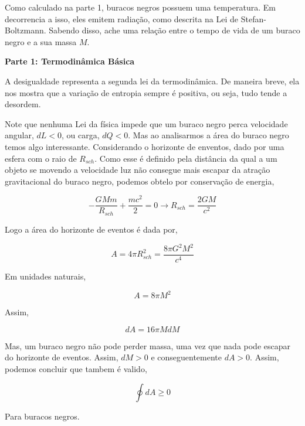 \documentclass[11pt]{article}
\begin{document}
\begin{pproblem}
    \begin{alternativas}
        \item Como calculado na parte 1, buracos negros possuem uma temperatura. Em decorrencia a isso, eles emitem radiação, como descrita na Lei de Stefan-Boltzmann. Sabendo disso, ache uma relação entre o tempo de vida de um buraco negro e a sua massa \(M\).
    \end{alternativas}

    \begin{pssolution*}{}{}
        \begin{center}
            \textbf{Parte 1: Termodinâmica Básica}
        \end{center}
        \begin{alternativas}
            \item A desigualdade representa a segunda lei da termodinâmica. De maneira breve, ela nos mostra que a variação de entropia sempre é positiva, ou seja, tudo tende a desordem.
            
            \item Note que nenhuma Lei da física impede que um buraco negro perca velocidade angular, \(dL < 0\), ou carga, \(dQ<0\). Mas ao analisarmos a área do buraco negro temos algo interessante. Considerando o horizonte de enventos, dado por uma esfera com o raio de \(R_{sch}\). Como esse é definido pela distância da qual a um objeto se movendo a velocidade luz não consegue mais escapar da atração gravitacional do buraco negro, podemos obtelo por conservação de energia, 
            
            \[-\frac{GMm}{R_{sch}} + \frac{mc^2}{2} = 0 \rightarrow R_{sch} = \frac{2GM}{c^2}\]
            
            Logo a área do horizonte de eventos é dada por, 

            \[A = 4\pi R_{sch}^2 = \frac{8\pi G^2M^2}{c^4}\]

            Em unidades naturais, 

            \[A = 8\pi M^2\]

            Assim, 

            \[dA = 16\pi MdM\]

            Mas, um buraco negro não pode perder massa, uma vez que nada pode escapar do horizonte de eventos. Assim, \(dM>0\) e conseguentemente \(dA>0\). Assim, podemos concluir que tambem é valido, 

            \[\oint dA \geq 0\]

            Para buracos negros.


\end{alternativas}
\end{pssolution*}
\end{pproblem}
\end{document}
